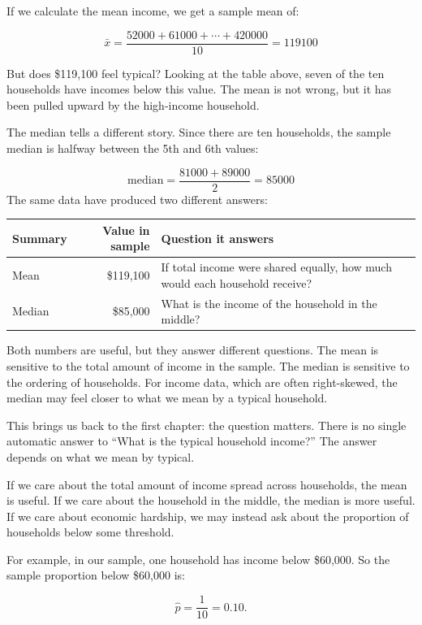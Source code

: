 \documentclass[
  letterpaper,
  DIV=11,
  numbers=noendperiod]{scrreprt}
\begin{document}
If we calculate the mean income, we get a sample mean of:

\[
\bar{x}
=
\frac{52000 + 61000 + \cdots + 420000}{10}
=
119100
\]

But does \$119,100 feel typical? Looking at the table above, seven of
the ten households have incomes below this value. The mean is not wrong,
but it has been pulled upward by the high-income household.

The median tells a different story. Since there are ten households, the
sample median is halfway between the 5th and 6th values:

\[
\text{median}
=
\frac{81000 + 89000}{2}
=
85000
\] The same data have produced two different answers:

\begin{table}
\fontsize{12.0pt}{14.0pt}\selectfont
\begin{tabular*}{\linewidth}{@{\extracolsep{\fill}}lrl}
\toprule
Summary & Value in sample & Question it answers \\ 
\midrule\addlinespace[2.5pt]
Mean & \$119,100 & If total income were shared equally, how much would each household receive? \\ 
Median & \$85,000 & What is the income of the household in the middle? \\ 
\bottomrule
\end{tabular*}
\end{table}

Both numbers are useful, but they answer different questions. The mean
is sensitive to the total amount of income in the sample. The median is
sensitive to the ordering of households. For income data, which are
often right-skewed, the median may feel closer to what we mean by a
typical household.

This brings us back to the first chapter: the question matters. There is
no single automatic answer to ``What is the typical household income?''
The answer depends on what we mean by typical.

If we care about the total amount of income spread across households,
the mean is useful. If we care about the household in the middle, the
median is more useful. If we care about economic hardship, we may
instead ask about the proportion of households below some threshold.

For example, in our sample, one household has income below \$60,000. So
the sample proportion below \$60,000 is:

\[
\hat{p}
=
\frac{1}{10}
=
0.10.
\]
\end{document}
